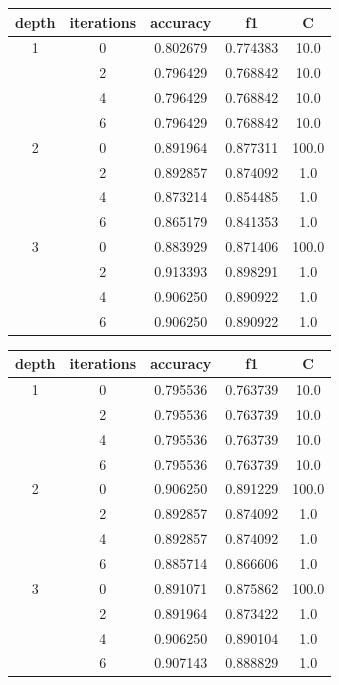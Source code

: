 \documentclass[12pt]{scrartcl}
\begin{document}
\newpage

\begin{center}
\begin{tabular}{ccccc}
\toprule
depth & iterations &  accuracy &        f1 &      C \\
\midrule
1 & 0 &  0.802679 &  0.774383 &   10.0 \\
  & 2 &  0.796429 &  0.768842 &   10.0 \\
  & 4 &  0.796429 &  0.768842 &   10.0 \\
  & 6 &  0.796429 &  0.768842 &   10.0 \\
\hline
2 & 0 &  0.891964 &  0.877311 &  100.0 \\
  & 2 &  0.892857 &  0.874092 &    1.0 \\
  & 4 &  0.873214 &  0.854485 &    1.0 \\
  & 6 &  0.865179 &  0.841353 &    1.0 \\
\hline
3 & 0 &  0.883929 &  0.871406 &  100.0 \\
  & 2 &  0.913393 &  0.898291 &    1.0 \\
  & 4 &  0.906250 &  0.890922 &    1.0 \\
  & 6 &  0.906250 &  0.890922 &    1.0 \\
\bottomrule
\end{tabular}
\end{center}

\begin{center}
\begin{tabular}{ccccc}
\toprule
depth & iterations & accuracy & f1 & C \\
\midrule
1 & 0 &  0.795536 &  0.763739 &   10.0 \\
  & 2 &  0.795536 &  0.763739 &   10.0 \\
  & 4 &  0.795536 &  0.763739 &   10.0 \\
  & 6 &  0.795536 &  0.763739 &   10.0 \\
\hline
2 & 0 &  0.906250 &  0.891229 &  100.0 \\
  & 2 &  0.892857 &  0.874092 &    1.0 \\
  & 4 &  0.892857 &  0.874092 &    1.0 \\
  & 6 &  0.885714 &  0.866606 &    1.0 \\
\hline
3 & 0 &  0.891071 &  0.875862 &  100.0 \\
  & 2 &  0.891964 &  0.873422 &    1.0 \\
  & 4 &  0.906250 &  0.890104 &    1.0 \\
  & 6 &  0.907143 &  0.888829 &    1.0 \\
\bottomrule
\end{tabular}
\end{center}
\end{document}

